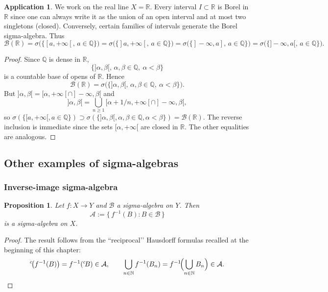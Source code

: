 \documentclass[11pt]{article}
\newtheorem{proposition}{Proposition}[section]
\theoremstyle{definition}
\newtheorem{application}{Application}[section]
\begin{document}
\begin{application}
We work on the real line $X=\mathbb R$. Every interval $I\subset\mathbb R$ is Borel in $\mathbb R$ since one can always write it as the union of an open interval and at most two singletons (closed). Conversely, certain families of intervals generate the Borel sigma-algebra. Thus
\[
\mathcal B(\mathbb R)
= \sigma\bigl(\{[a,+\infty[,\, a\in\mathbb Q\}\bigr)
= \sigma\bigl(\{]a,+\infty[,\, a\in\mathbb Q\}\bigr)
= \sigma\bigl(\{]-\infty,a],\, a\in\mathbb Q\}\bigr)
= \sigma\bigl(\{]-\infty,a[,\, a\in\mathbb Q\}\bigr).
\]

\end{application}

\begin{proof}

Since $\mathbb Q$ is dense in $\mathbb R$,
\[
\{] \alpha,\beta[,\, \alpha,\beta\in\mathbb Q,\ \alpha<\beta\}
\]
is a countable base of opens of $\mathbb R$. Hence
\[
\mathcal B(\mathbb R)=\sigma\bigl(\{] \alpha,\beta[,\, \alpha,\beta\in\mathbb Q,\ \alpha<\beta\}\bigr).
\]
But $] \alpha,\beta[ = [\alpha,+\infty[ \cap ]-\infty,\beta[$ and
\[
] \alpha,\beta[=\bigcup_{n\ge1} [\alpha+1/n,+\infty[ \cap ]-\infty,\beta[,
\]
so $\sigma(\{[a,+\infty[, a\in\mathbb Q\})\supset \sigma(\{] \alpha,\beta[, \alpha,\beta\in\mathbb Q,\alpha<\beta\})=\mathcal B(\mathbb R)$. The reverse inclusion is immediate since the sets $[\alpha,+\infty[$ are closed in $\mathbb R$. The other equalities are analogous.

\end{proof}

\subsection{Other examples of sigma-algebras}\label{subsec:3.2}

\subsubsection{Inverse-image sigma-algebra}

\begin{proposition}\label{prop:preimage}
Let $f:X\to Y$ and $\mathcal B$ a sigma-algebra on $Y$. Then
\[
\mathcal A:=\{\,f^{-1}(B): B\in\mathcal B\,\}
\]
is a sigma-algebra on $X$.
\end{proposition}

\begin{proof}
The result follows from the “reciprocal’’ Hausdorff formulas recalled at the beginning of this chapter:
\[
{}^{c}\!\bigl(f^{-1}(B)\bigr)= f^{-1}({}^{c}\!B)\in\mathcal A,
\qquad
\bigcup_{n\in\mathbb N} f^{-1}(B_n)= f^{-1}\!\Bigl(\bigcup_{n\in\mathbb N} B_n\Bigr)\in\mathcal A.
\]

\end{proof}
\end{document}
